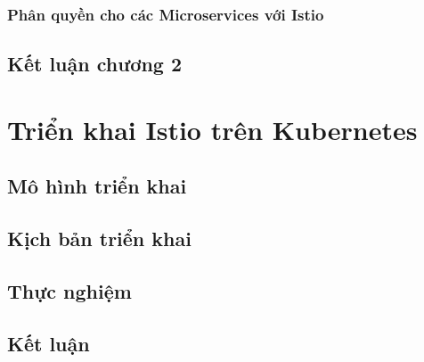 \documentclass[12pt,a4paper]{report}
\begin{document}
			\subsection{Phân quyền cho các Microservices với Istio}
		\section*{Kết luận chương 2}
	\chapter{Triển khai Istio trên Kubernetes}
		\section{Mô hình triển khai}
		\section{Kịch bản triển khai}
		\section{Thực nghiệm}
		\section{Kết luận}
	
\end{document}
